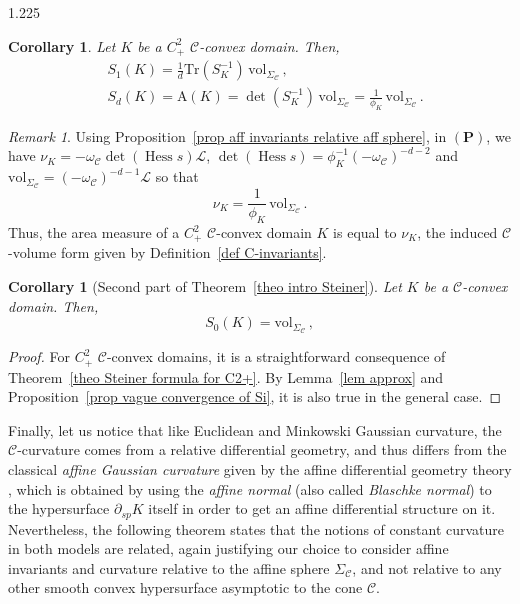 \documentclass[reqno, a4paper]{amsart}
\numberwithin{equation}{section}
\numberwithin{figure}{section}
\newtheorem{corollary}[theorem]{Corollary}
\theoremstyle{definition}
\theoremstyle{remark}
\newtheorem{remark}[theorem]{Remark}
\DeclareMathOperator{\Hess}{Hess} %
\newcommand{\C}{\mathcal{C}} %
\renewcommand{\S}{\Sigma_\C} %
\newcommand{\vol}{\mathrm{vol}} %
\newcommand{\Area}{\mathrm{A}} %
\begin{document}
\begin{spacing}{1.225}
\begin{corollary}
\label{cor link A(K) vol}
Let $K$ be a $C^2_+$ $\C$-convex domain. Then,
\begin{align*}
& S_1(K) = \frac{1}{d}\mathrm{Tr}(S_K^{-1}) \, \vol_{\S} \, , \\
& S_d(K) = \Area(K) = \det(S_K^{-1}) \, \vol_{\S} = \frac{1}{\phi_K} \,\vol_{\S} \, .
\end{align*}
\end{corollary}

\begin{remark}
Using Proposition~\ref{prop aff invariants relative aff sphere}, in $(\mathbf{P})$, we have $\nu_K = -\omega_\C \det(\Hess s) \mathcal{L}$, $ \det(\Hess s) = \phi_K^{-1} (-\omega_\C)^{-d-2}$ and $ \vol_{\S} = (-\omega_\C)^{-d-1} \mathcal{L}$ so that 
\begin{equation*}
    \nu_K = \frac{1}{\phi_K} \,\vol_{\S} \, .
\end{equation*}
Thus, the area measure of a $C^2_+$ $\C$-convex domain $K$ is equal to $\nu_K$, the induced $\C$-volume form given by Definition~\ref{def C-invariants}.
\end{remark}


\begin{corollary}[Second part of Theorem~\ref{theo intro Steiner}]
\label{cor S0}
Let $K$ be a $\C$-convex domain. Then, 
\begin{equation*}
S_0(K) = \vol_{\S} \, ,
\end{equation*}
\end{corollary}
\begin{proof}
For $C^2_+$ $\C$-convex domains, it is a straightforward consequence of Theorem~\ref{theo Steiner formula for C2+}. By Lemma~\ref{lem approx} and Proposition~\ref{prop vague convergence of Si}, it is also true in the general case.
\end{proof}




Finally, let us notice that like Euclidean and Minkowski Gaussian curvature, the $\C$-curvature comes from a relative differential geometry, and thus differs from the classical \emph{affine Gaussian curvature} given by the affine differential geometry theory \cite[Definition~3.4]{Nomizu_Sassaki_95}, which is obtained by using the \emph{affine normal} (also called \emph{Blaschke normal}) to the hypersurface $\partial_{sp} K$ itself in order to get an affine differential structure on it. Nevertheless, the following theorem states that the notions of constant curvature in both models are related, again justifying our choice to consider affine invariants and curvature relative to the affine sphere $\S$, and not relative to any other smooth convex hypersurface asymptotic to the cone $\C$. 


\end{spacing}
\end{document}

